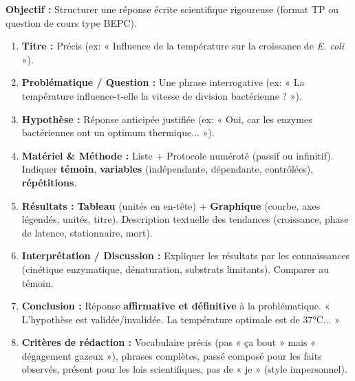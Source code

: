\documentclass[11pt]{article}
\begin{document}
\begin{methode}
    \textbf{Objectif :} Structurer une réponse écrite scientifique rigoureuse (format TP ou question de cours type BEPC).
    \begin{enumerate}
        \item \textbf{Titre :} Précis (ex: « Influence de la température sur la croissance de \emph{E. coli} »).
        \item \textbf{Problématique / Question :} Une phrase interrogative (ex: « La température influence-t-elle la vitesse de division bactérienne ? »).
        \item \textbf{Hypothèse :} Réponse anticipée justifiée (ex: « Oui, car les enzymes bactériennes ont un optimum thermique... »).
        \item \textbf{Matériel \& Méthode :} Liste + Protocole numéroté (passif ou infinitif). Indiquer \textbf{témoin}, \textbf{variables} (indépendante, dépendante, contrôlées), \textbf{répétitions}.
        \item \textbf{Résultats :} \textbf{Tableau} (unités en en-tête) + \textbf{Graphique} (courbe, axes légendés, unités, titre). Description textuelle des tendances (croissance, phase de latence, stationnaire, mort).
        \item \textbf{Interprétation / Discussion :} Expliquer les résultats par les connaissances (cinétique enzymatique, dénaturation, substrats limitants). Comparer au témoin.
        \item \textbf{Conclusion :} Réponse \textbf{affirmative et définitive} à la problématique. « L'hypothèse est validée/invalidée. La température optimale est de 37°C... »
        \item \textbf{Critères de rédaction :} Vocabulaire précis (pas « ça bout » mais « dégagement gazeux »), phrases complètes, passé composé pour les faits observés, présent pour les lois scientifiques, pas de « je » (style impersonnel).
    \end{enumerate}
\end{methode}
\end{document}
